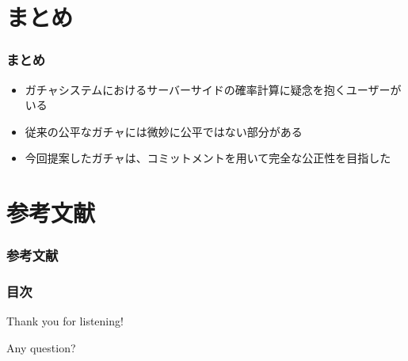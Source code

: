 \section{まとめ}
\begin{frame}
  \frametitle{まとめ}
  
  \begin{itemize}
    \item<2-> ガチャシステムにおけるサーバーサイドの確率計算に疑念を抱くユーザーがいる
    \item<3-> 従来の公平なガチャには微妙に公平ではない部分がある
    \item<4-> 今回提案したガチャは、コミットメントを用いて完全な公正性を目指した
  \end{itemize}
\end{frame}

\section*{参考文献}
\begin{frame}
  \frametitle{参考文献}

  
  \nocite{*}
  
\end{frame}

\begin{frame}
  \frametitle{目次}

  \tableofcontents[hideallsubsections]
\end{frame}

\begin{frame}
  \centering
  {\Huge Thank you for listening!}

  \quad \quad

  {\Huge Any question?}
\end{frame}


